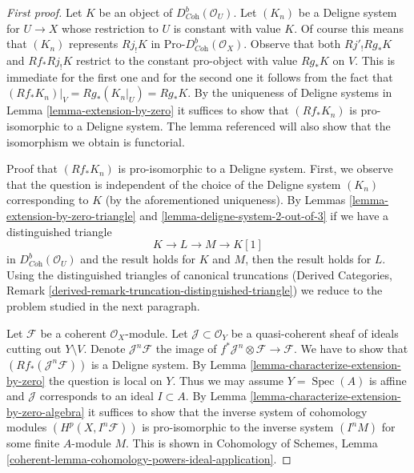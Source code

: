 \documentclass{stacks-project}
\theoremstyle{plain}
\theoremstyle{definition}
\theoremstyle{remark}
\numberwithin{equation}{subsection}
\def\Spec{\mathop{\mathrm{Spec}}}
\begin{document}
\begin{proof}[First proof]
Let $K$ be an object of $D^b_{\textit{Coh}}(\mathcal{O}_U)$. Let $(K_n)$
be a Deligne system for $U \to X$ whose restriction to $U$ is constant
with value $K$. Of course this means that $(K_n)$ represents $Rj_!K$
in $\text{Pro-}D^b_{\textit{Coh}}(\mathcal{O}_X)$. Observe that
both $Rj'_!Rg_*K$ and $Rf_*Rj_!K$ restrict to the constant pro-object with
value $Rg_*K$ on $V$. This is immediate for the first one and for the second
one it follows from the fact that $(Rf_*K_n)|_V = Rg_*(K_n|_U) = Rg_*K$.
By the uniqueness of Deligne systems in Lemma \ref{lemma-extension-by-zero}
it suffices to show that $(Rf_*K_n)$ is pro-isomorphic to a
Deligne system. The lemma referenced will also show that the
isomorphism we obtain is functorial.

\medskip\noindent
Proof that $(Rf_*K_n)$ is pro-isomorphic to a Deligne system.
First, we observe that the question is independent of the choice
of the Deligne system $(K_n)$ corresponding to $K$ (by the aforementioned
uniqueness). By Lemmas \ref{lemma-extension-by-zero-triangle} and
\ref{lemma-deligne-system-2-out-of-3}
if we have a distinguished triangle
$$
K \to L \to M \to K[1]
$$
in $D^b_{\textit{Coh}}(\mathcal{O}_U)$ and the result holds for
$K$ and $M$, then the result holds for $L$. Using the distinguished
triangles of canonical truncations (Derived Categories, Remark
\ref{derived-remark-truncation-distinguished-triangle})
we reduce to the problem studied in the next paragraph.

\medskip\noindent
Let $\mathcal{F}$ be a coherent $\mathcal{O}_X$-module.
Let $\mathcal{J} \subset \mathcal{O}_Y$ be a quasi-coherent
sheaf of ideals cutting out $Y \setminus V$. Denote
$\mathcal{J}^n\mathcal{F}$ the image of
$f^*\mathcal{J}^n \otimes \mathcal{F} \to \mathcal{F}$.
We have to show that $(Rf_*(\mathcal{J}^n\mathcal{F}))$
is a Deligne system. By Lemma \ref{lemma-characterize-extension-by-zero}
the question is local on $Y$. Thus we may assume $Y = \Spec(A)$ is affine
and $\mathcal{J}$ corresponds to an ideal $I \subset A$. By
Lemma \ref{lemma-characterize-extension-by-zero-algebra}
it suffices to show that the inverse system of cohomology modules
$(H^p(X, I^n\mathcal{F}))$ is pro-isomorphic to the inverse system
$(I^n M)$ for some finite $A$-module $M$.
This is shown in Cohomology of Schemes, Lemma
\ref{coherent-lemma-cohomology-powers-ideal-application}.
\end{proof}
\end{document}
